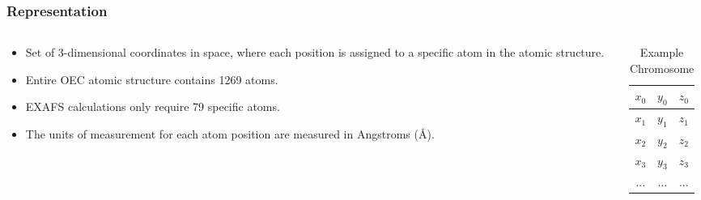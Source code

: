 \documentclass[10pt]{beamer}
\begin{document}




\begin{frame}
	\frametitle{Representation}

	\begin{columns}[T]
		\begin{column}{.6\textwidth}
			\begin{itemize}
				\item Set of 3-dimensional coordinates in space, where each position is assigned to a specific atom in the atomic structure.
				\item Entire OEC atomic structure contains 1269 atoms.
				\item EXAFS calculations only require 79 specific atoms.
				\item The units of measurement for each atom position are measured in Angstroms (\AA).
			\end{itemize}
		\end{column}
		\begin{column}{.4\textwidth}
			
			\begin{table}
				\caption{Example Chromosome}
				\begin{tabular}{ | c  c  c | }
					\hline
					$x_{0}$ & $y_{0}$ & $z_{0}$ \\ \hline
					$x_{1}$ & $y_{1}$ & $z_{1}$ \\ \hline
					$x_{2}$ & $y_{2}$ & $z_{2}$ \\ \hline
					$x_{3}$ & $y_{3}$ & $z_{3}$ \\ \hline
					... & ... & ... \\ \hline
				\end{tabular}
			\end{table}

		\end{column}
	\end{columns}

\end{frame}
\end{document}

